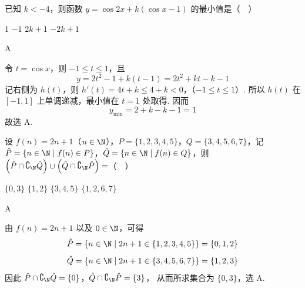 \begin{problem}
已知 \(k < -4\)，则函数 \(y = \cos 2x + k(\cos x - 1)\) 的最小值是（\(\quad\)）

\choices
    {\(1\)}
    {\(-1\)}
    {\(2k + 1\)}
    {\(-2k + 1\)}

\begin{answer}
A
\end{answer}

\begin{solution}
令 \(t=\cos x\)，则 \(-1\leqslant t\leqslant1\)，且
\[
y=2t^2-1+k(t-1)=2t^2+kt-k-1
\]
记右侧为 \(h(t)\)，则
\(h'(t)=4t+k\leqslant4+k<0\)，（\(-1\leqslant t\leqslant1\)）.
所以 \(h(t)\) 在 \([-1,1]\) 上单调递减，最小值在 \(t=1\) 处取得. 因而
\[
y_{\min}=2+k-k-1=1
\]
故选 A.
\end{solution}
\end{problem}

\begin{problem}
设 \( f(n) = 2n + 1\)（\(n \in \N\)），\( P = \{1, 2, 3, 4, 5\} \)，\( Q = \{3, 4, 5, 6, 7\} \)，记 \( \hat{P} = \{n \in \N \mid f(n) \in P\} \)，\( \hat{Q} = \{n \in \N \mid f(n) \in Q\} \)，则 \( \left(\hat{P} \cap \complement_{\N} \hat{Q}\right) \cup \left(\hat{Q} \cap \complement_{\N} \hat{P}\right) = \)（\(\quad\)）

\choices
    {\(\{0, 3\}\)}
    {\(\{1, 2\}\)}
    {\(\{3, 4, 5\}\)}
    {\(\{1, 2, 6, 7\}\)}

\begin{answer}
A
\end{answer}

\begin{solution}
由 \(f(n)=2n+1\) 以及 \(0\in\N\)，可得
\[
\hat P=\{n\in\N\mid 2n+1\in\{1,2,3,4,5\}\}=\{0,1,2\}
\]
\[
\hat Q=\{n\in\N\mid 2n+1\in\{3,4,5,6,7\}\}=\{1,2,3\}
\]
因此
\(\hat P\cap\complement_{\N}\hat Q=\{0\}\)，\(\hat Q\cap\complement_{\N}\hat P=\{3\}\)，
从而所求集合为 \(\{0,3\}\)，选 A.
\end{solution}
\end{problem}

